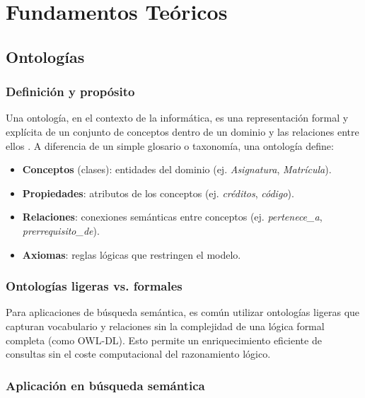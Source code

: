 \documentclass[12pt, a4paper, twoside]{report}
\begin{document}
\chapter{Fundamentos Te\'oricos}
\label{ch:fundamentos}

\section{Ontolog\'ias}

\subsection{Definici\'on y prop\'osito}

Una ontolog\'ia, en el contexto de la inform\'atica, es una representaci\'on formal y expl\'icita de un conjunto de conceptos dentro de un dominio y las relaciones entre ellos \cite{gruber1993}. A diferencia de un simple glosario o taxonom\'ia, una ontolog\'ia define:

\begin{itemize}
  \item \textbf{Conceptos} (clases): entidades del dominio (ej. \textit{Asignatura}, \textit{Matr\'icula}).
  \item \textbf{Propiedades}: atributos de los conceptos (ej. \textit{cr\'editos}, \textit{c\'odigo}).
  \item \textbf{Relaciones}: conexiones sem\'anticas entre conceptos (ej. \textit{pertenece\_a}, \textit{prerrequisito\_de}).
  \item \textbf{Axiomas}: reglas l\'ogicas que restringen el modelo.
\end{itemize}

\subsection{Ontolog\'ias ligeras vs. formales}

Para aplicaciones de b\'usqueda sem\'antica, es com\'un utilizar ontolog\'ias ligeras que capturan vocabulario y relaciones sin la complejidad de una l\'ogica formal completa (como OWL-DL). Esto permite un enriquecimiento eficiente de consultas sin el coste computacional del razonamiento l\'ogico.

\subsection{Aplicaci\'on en b\'usqueda sem\'antica}
\end{document}
